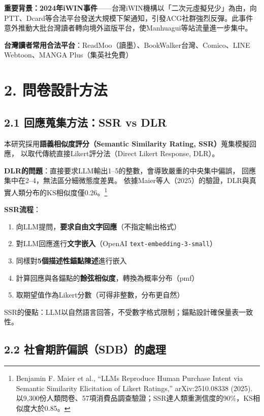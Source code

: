 \documentclass[12pt, a4paper]{article}
\begin{document}
\textbf{重要背景：2024年iWIN事件}——台灣iWIN機構以「二次元虛擬兒少」為由，向PTT、Dcard等合法平台發送大規模下架通知，引發ACG社群強烈反彈。此事件意外推動大批台灣讀者轉向境外盜版平台，使Manhuagui等站流量進一步集中。

\medskip
\noindent\textbf{台灣讀者常用合法平台}：ReadMoo（讀墨）、BookWalker台灣、Comico、LINE Webtoon、MANGA Plus（集英社免費）

\section{2. 問卷設計方法}

\subsection{2.1 回應蒐集方法：SSR vs DLR}

本研究採用\textbf{語義相似度評分（Semantic Similarity Rating, SSR）}蒐集模擬回應，
以取代傳統直接Likert評分法（Direct Likert Response, DLR）。

\textbf{DLR的問題}：直接要求LLM輸出1–5的整數，會導致嚴重的中央集中偏誤，
回應集中在2–4，無法區分細微態度差異。
依據Maier等人（2025）的驗證，DLR與真實人類分布的KS相似度僅0.26。\footnote{Benjamin F. Maier et al., ``LLMs Reproduce Human Purchase Intent via Semantic Similarity Elicitation of Likert Ratings,'' arXiv:2510.08338 (2025). 以9,300份人類問卷、57項消費品調查驗證；SSR達人類重測信度的90\%，KS相似度大於0.85。}

\medskip
\textbf{SSR流程}：
\begin{enumerate}[leftmargin=2em]
  \item 向LLM提問，\textbf{要求自由文字回應}（不指定輸出格式）
  \item 對LLM回應進行\textbf{文字嵌入}（OpenAI \texttt{text-embedding-3-small}）
  \item 同樣對\textbf{5個描述性錨點陳述}進行嵌入
  \item 計算回應與各錨點的\textbf{餘弦相似度}，轉換為概率分布（pmf）
  \item 取期望值作為Likert分數（可得非整數，分布更自然）
\end{enumerate}

SSR的優點：LLM以自然語言回答，不受數字格式限制；錨點設計確保量表一致性。

\subsection{2.2 社會期許偏誤（SDB）的處理}
\end{document}
